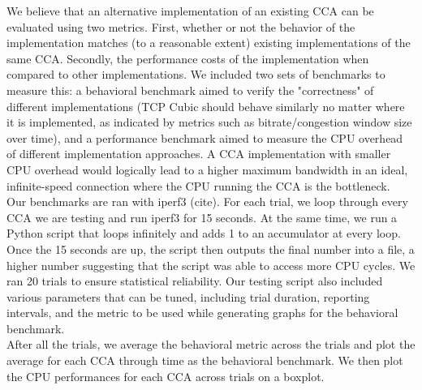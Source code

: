 \documentclass[../main.tex]{subfiles}
\begin{document}
We believe that an alternative implementation of an existing CCA can be evaluated using two metrics. First, whether or not the behavior of the implementation matches (to a reasonable extent) existing implementations of the same CCA. Secondly, the performance costs of the implementation when compared to other implementations. We included two sets of benchmarks to measure this: a behavioral benchmark aimed to verify the "correctness" of different implementations (TCP Cubic should behave similarly no matter where it is implemented, as indicated by metrics such as bitrate/congestion window size over time), and a performance benchmark aimed to measure the CPU overhead of different implementation approaches. A CCA implementation with smaller CPU overhead would logically lead to a higher maximum bandwidth in an ideal, infinite-speed connection where the CPU running the CCA is the bottleneck. \\
Our benchmarks are ran with iperf3 (cite). For each trial, we loop through every CCA we are testing and run iperf3 for 15 seconds. At the same time, we run a Python script that loops infinitely and adds 1 to an accumulator at every loop. Once the 15 seconds are up, the script then outputs the final number into a file, a higher number suggesting that the script was able to access more CPU cycles. We ran 20 trials to ensure statistical reliability. Our testing script also included various parameters that can be tuned, including trial duration, reporting intervals, and the metric to be used while generating graphs for the behavioral benchmark. \\
After all the trials, we average the behavioral metric across the trials and plot the average for each CCA through time as the behavioral benchmark. We then plot the CPU performances for each CCA across trials on a boxplot. \\
\end{document}
